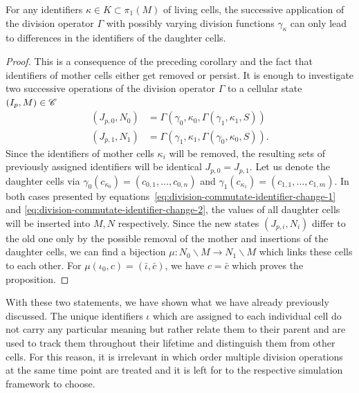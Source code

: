 \begin{proposition}
    For any identifiers $\kappa\in K\subset\pi_1(M)$ of living cells, the successive application of
    the division operator $\Gamma$ with possibly varying division functions $\gamma_\kappa$ can
    only lead to differences in the identifiers of the daughter cells.
    \label{proposition:commute-cell-division-operators}
\end{proposition}
\begin{proof}
    This is a consequence of the preceding corollary and the fact that identifiers of mother cells
    either get removed or persist.
    It is enough to investigate two successive operations of the division operator $\Gamma$ to a
    cellular state $(I_p,M)\in\mathscr{C}$
    \begin{align}
        (J_{p,0},N_0) &= \Gamma(\gamma_0, \kappa_0, \Gamma(\gamma_1, \kappa_1, S))
        \label{eq:division-commutate-identifier-change-1}\\
        (J_{p,1},N_1) &= \Gamma(\gamma_1, \kappa_1, \Gamma(\gamma_0, \kappa_0, S)).
        \label{eq:division-commutate-identifier-change-2}
    \end{align}
    Since the identifiers of mother cells $\kappa_i$ will be removed, the resulting sets of
    previously assigned identifiers will be identical $J_{p,0}=J_{p,1}$.
    Let us denote the daughter cells via $\gamma_0(c_{\kappa_0})=(c_{0,1},\dots,c_{0,n})$ and
    $\gamma_1(c_{\kappa_1})=(c_{1,1},\dots,c_{1,m})$.
    In both cases presented by equations~\eqref{eq:division-commutate-identifier-change-1} and
    \eqref{eq:division-commutate-identifier-change-2}, the values of all daughter cells will be
    inserted into $M,N$ respectively.
    Since the new states $(J_{p,i},N_i)$ differ to the old one only by the possible removal of the
    mother and insertions of the daughter cells, we can find a bijection
    $\mu:N_0\backslash M\rightarrow N_1\backslash M$ which links these cells to each other.
    For $\mu(\iota_0,c)=(\bar{\iota},\bar{c})$, we have $c=\bar{c}$ which proves the proposition.
\end{proof}

With these two statements, we have shown what we have already previously discussed.
The unique identifiers $\iota$ which are assigned to each individual cell do not carry any
particular meaning but rather relate them to their parent and are used to track them throughout
their lifetime and distinguish them from other cells.
For this reason, it is irrelevant in which order multiple division operations at the same time
point are treated and it is left for to the respective simulation framework to choose.

